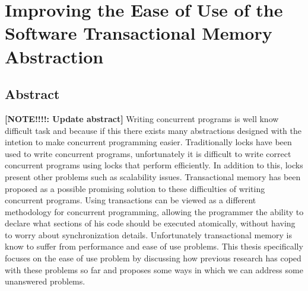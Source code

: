 \documentclass[11pt]{book}
\newcommand{\anote}[1]{{\bf [NOTE!!!!: #1]}}
\begin{document}








\section*{Improving the Ease of Use of the Software Transactional Memory Abstraction}
\subsection*{Abstract}
\anote{Update abstract}
Writing concurrent programs is well know difficult task and because
if this there exists many abstractions designed with the intetion to make concurrent programming
easier. Traditionally locks have been used to write concurrent programs, unfortunately it is
difficult to write correct concurrent programs using locks that perform efficiently. In addition
to this, locks present other problems such as scalability issues. Transactional memory has been
proposed as a possible promising solution to these difficulties of writing concurrent programs.
Using transactions can be viewed as a different methodology for concurrent programming, allowing
the programmer the ability to declare what sections of his code should be executed atomically,
without having to worry about synchronization details. Unfortunately transactional memory is
know to suffer from performance and ease of use problems. This thesis specifically focuses on
the ease of use problem by discussing how previous research has coped with these problems so
far and proposes some ways in which we can address some unanswered problems.
\end{document}
